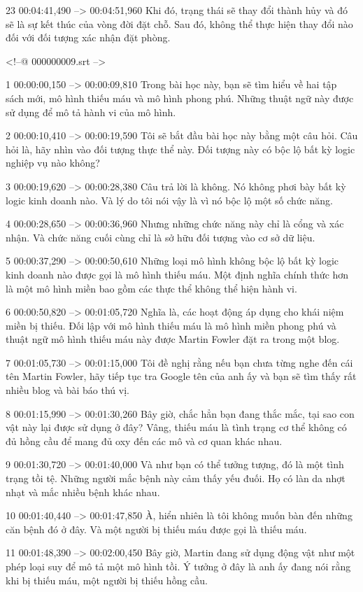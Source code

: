 23
00:04:41,490 --> 00:04:51,960
Khi đó, trạng thái sẽ thay đổi thành hủy và đó sẽ là sự kết thúc của vòng đời đặt chỗ. Sau đó, không thể thực hiện thay đổi nào đối với đối tượng xác nhận đặt phòng.

<!--@ 000000009.srt -->

1
00:00:00,150 --> 00:00:09,810
Trong bài học này, bạn sẽ tìm hiểu về hai tập sách mới, mô hình thiếu máu và mô hình phong phú.  Những thuật ngữ này được sử dụng để mô tả hành vi của mô hình.

2
00:00:10,410 --> 00:00:19,590
Tôi sẽ bắt đầu bài học này bằng một câu hỏi.  Câu hỏi là, hãy nhìn vào đối tượng thực thể này.  Đối tượng này có bộc lộ bất kỳ logic nghiệp vụ nào không?

3
00:00:19,620 --> 00:00:28,380
Câu trả lời là không.  Nó không phơi bày bất kỳ logic kinh doanh nào.  Và lý do tôi nói vậy là vì nó bộc lộ một số chức năng.

4
00:00:28,650 --> 00:00:36,960
Nhưng những chức năng này chỉ là cổng và xác nhận.  Và chức năng cuối cùng chỉ là sở hữu đối tượng vào cơ sở dữ liệu.

5
00:00:37,290 --> 00:00:50,610
Những loại mô hình không bộc lộ bất kỳ logic kinh doanh nào được gọi là mô hình thiếu máu.  Một định nghĩa chính thức hơn là một mô hình miền bao gồm các thực thể không thể hiện hành vi.

6
00:00:50,820 --> 00:01:05,720
Nghĩa là, các hoạt động áp dụng cho khái niệm miền bị thiếu.  Đối lập với mô hình thiếu máu là mô hình miền phong phú và thuật ngữ mô hình thiếu máu này được Martin Fowler đặt ra trong một blog.

7
00:01:05,730 --> 00:01:15,000
Tôi đề nghị rằng nếu bạn chưa từng nghe đến cái tên Martin Fowler, hãy tiếp tục tra Google tên của anh ấy và bạn sẽ tìm thấy rất nhiều blog và bài báo thú vị.

8
00:01:15,990 --> 00:01:30,260
Bây giờ, chắc hẳn bạn đang thắc mắc, tại sao con vật này lại được sử dụng ở đây?  Vâng, thiếu máu là tình trạng cơ thể không có đủ hồng cầu để mang đủ oxy đến các mô và cơ quan khác nhau.

9
00:01:30,720 --> 00:01:40,000
Và như bạn có thể tưởng tượng, đó là một tình trạng tồi tệ.  Những người mắc bệnh này cảm thấy yếu đuối.  Họ có làn da nhợt nhạt và mắc nhiều bệnh khác nhau.

10
00:01:40,440 --> 00:01:47,850
À, hiển nhiên là tôi không muốn bàn đến những căn bệnh đó ở đây.  Và một người bị thiếu máu được gọi là thiếu máu.

11
00:01:48,390 --> 00:02:00,450
Bây giờ, Martin đang sử dụng động vật như một phép loại suy để mô tả một mô hình tồi.  Ý tưởng ở đây là anh ấy đang nói rằng khi bị thiếu máu, một người bị thiếu hồng cầu.

